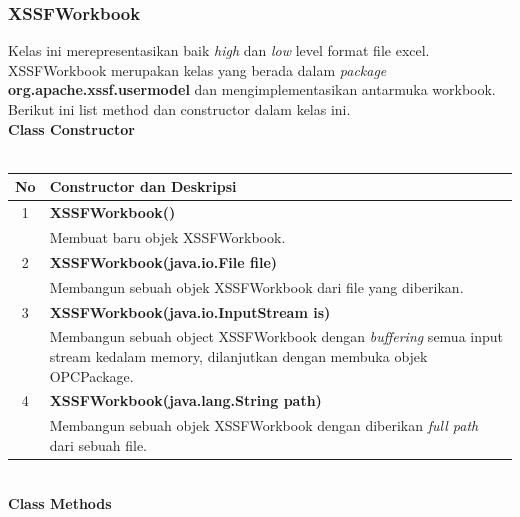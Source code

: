 \subsubsection{XSSFWorkbook}
Kelas ini merepresentasikan baik \textit{high} dan \textit{low} level format file excel. XSSFWorkbook merupakan kelas yang berada dalam \textit{package} \textbf{org.apache.xssf.usermodel} dan mengimplementasikan antarmuka workbook. Berikut ini list method dan constructor dalam kelas ini.\cite{apachepoi2}
\\
\noindent \textbf{Class Constructor}\\ \\
	\begin{tabular}{|c|p{12cm}|}
		\hline
		\textbf{No} & \textbf{Constructor dan Deskripsi} \\ \hline \hline
		1 & \textbf{XSSFWorkbook()}\\
			&	Membuat baru objek XSSFWorkbook.\\ \hline 
		2 & \textbf{XSSFWorkbook(java.io.File file)}\\
			&	Membangun sebuah objek XSSFWorkbook dari file yang diberikan.\\ \hline
		3 & \textbf{XSSFWorkbook(java.io.InputStream is)}\\
			&	Membangun sebuah object XSSFWorkbook dengan \textit{buffering} semua input stream kedalam memory, dilanjutkan dengan membuka objek OPCPackage.\\ \hline 
		4 & \textbf{XSSFWorkbook(java.lang.String path)}\\
			&	Membangun sebuah objek XSSFWorkbook dengan diberikan \textit{full path} dari sebuah file.\\ \hline
	\end{tabular}
\\
\noindent \textbf{Class Methods}\\ \\

